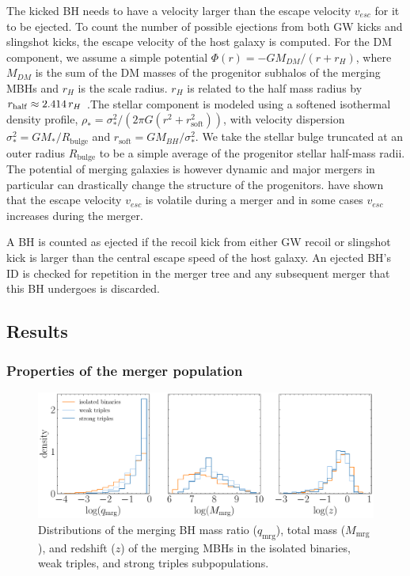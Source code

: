 \documentclass[11pt, letterpaper]{article}
\begin{document}
The kicked BH needs to have a velocity larger than the escape velocity $v_{esc}$ for it to be ejected. To count the number of possible ejections from both GW kicks and slingshot kicks, the escape velocity of the host galaxy is computed. For the DM component, we assume a simple \cite{Hernquist1990} potential $\Phi(r) = - G M_{DM} / (r + r_H)$, where $M_{DM}$ is the sum of the DM masses of the progenitor subhalos of the merging MBHs and $r_H$ is the scale radius. $r_H$ is related to the half mass radius by $r_{\rm half} \approx 2.414 \, r_{H}$  .The stellar component is modeled using a softened isothermal density profile, $\rho_{*} = \sigma_{*}^{2}/(2 \pi G (r^2 + r^2_{\text{soft}}))$, with velocity dispersion $\sigma^2_{*} = G M_{*}/R_{\text{bulge}}$ and $r_{\text{soft}} = G M_{BH}/\sigma^{2}_{*}$. We take the stellar bulge truncated at an outer radius $R_{\text{bulge}}$ to be a simple average of the progenitor stellar half-mass radii. The potential of merging galaxies is however dynamic and major mergers in particular can drastically change the structure of the progenitors. \cite{blecha_recoiling_2011} have shown that the escape velocity $v_{esc} $ is volatile during a merger and in some cases $v_{esc}$ increases during the merger.

A BH is counted as ejected if the recoil kick from either GW recoil or slingshot kick is larger than the central escape speed of the host galaxy. An ejected BH's ID is checked for repetition in the merger tree and any subsequent merger that this BH undergoes is discarded. 



\subsection{Results}


\subsubsection{Properties of the merger population}
\label{sec:merger-properties}

\begin{figure}[!htb] 
    \centering
    \includegraphics[scale=0.7]{fig/mrg_properties_hist.pdf}
    \caption{Distributions of the merging BH mass ratio ($q_{\text{mrg}}$), total mass ($M_{\text{mrg}}$), and redshift ($z$) of the merging MBHs in the isolated binaries, weak triples, and strong triples subpopulations.}
    \label{fig:merger-properties-hist}
\end{figure}
\end{document}
